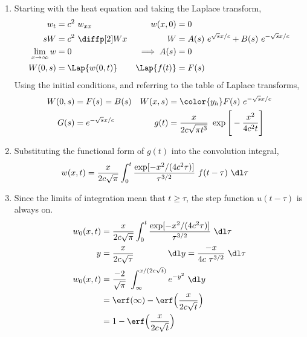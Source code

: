 \begin{enumerate}
    \item Starting with the heat equation and taking the Laplace transform,
          \begin{align}
              w_t                   & = c^2\ w_{xx}           &
              w(x, 0)               & = 0                       \\
              sW                    & = c^2\ \diffp[2] Wx     &
              W                     & = A(s)\ e^{\sqrt{s}x/c}
              + B(s)\ e^{-\sqrt{s}x/c}                          \\
              \lim_{x \to \infty} w & = 0                     &
              \implies A(s)         & = 0                       \\
              W(0, s)               & = \Lap\{w(0, t)\}       &
              \Lap\{f(t)\}          & = F(s)
          \end{align}
          Using the initial conditions, and referring to the table of Laplace
          transforms,
          \begin{align}
              W(0, s) & = F(s) = B(s)                                                &
              W(x, s) & = \color{y_h} F(s)\ e^{-\sqrt{s}x/c}                           \\
              G(s)    & = e^{-\sqrt{s}x/c}                                           &
              g(t)    & = \frac{x}{2c\sqrt{\pi t^3}}\ \exp \Bigg[ -\frac{x^2}{4c^2t}
                  \Bigg]
          \end{align}

    \item Substituting the functional form of $ g(t) $ into the convolution integral,
          \begin{align}
              w(x, t) & = \frac{x}{2c\sqrt{\pi}} \int_0^t \frac{\exp[-x^2/(4c^2\tau)]}
              {\tau^{3/2}}\ f(t - \tau)\ \dl \tau
          \end{align}

    \item Since the limits of integration mean that $ t \geq \tau $, the step
          function $ u(t - \tau) $ is always on.
          \begin{align}
              w_0(x, t) & = \frac{x}{2c\sqrt{\pi}} \int_0^t
              \frac{\exp[-x^2/(4c^2\tau)]}{\tau^{3/2}}\ \dl \tau                  \\
              y         & = \frac{x}{2c\sqrt{\tau}} \qquad\qquad
              \dl y = \frac{-x}{4c\ \tau^{3/2}}\ \dl \tau                         \\
              w_0(x, t) & = \frac{-2}{\sqrt{\pi}}\ \int_{\infty}^{x/(2c\sqrt{t})}
              e^{-y^2}\ \dl y                                                     \\
                        & = \erf(\infty) - \erf\Big( \frac{x}{2c\sqrt{t}} \Big)   \\
                        & = 1 - \erf\Big( \frac{x}{2c\sqrt{t}} \Big)
          \end{align}


\end{enumerate}
